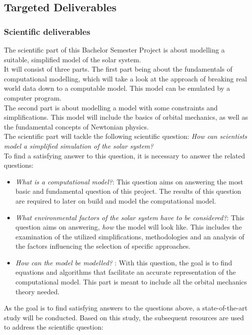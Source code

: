 \documentclass[conference,compsoc]{IEEEtran}
\begin{document}
\subsection{Targeted Deliverables}
\label{sec-deliverables}
\subsubsection{Scientific deliverables}
The scientific part of this Bachelor Semester Project is about modelling a suitable, simplified model of the solar system.\\
It will consist of three parts. The first part being about the fundamentals of computational modelling, which will take a look at the approach of breaking real world data down to a computable model. This model can be emulated by a computer program.\\
The second part is about modelling a model with some constraints and simplifications. This model will include the basics of orbital mechanics, as well as the fundamental concepts of Newtonian physics.\\ 
The scientific part will tackle the following scientific question: \emph{How can scientists model a simplified simulation of the solar system?} \\
To find a satisfying answer to this question, it is necessary to answer the related questions:
\begin{itemize}
	\item \emph{What is a computational model?}: This question aims on answering the most basic and fundamental question of this project. The results of this question are required to later on build and model the computational model.
	\item \emph{What environmental factors of the solar system have to be considered?}: This question aims on answering, \emph{how} the model will look like. This includes the examination of the utilized simplifications, methodologies and an analysis of the factors influencing the selection of specific approaches.
	\item \emph{How can the model be modelled? }: With this question, the goal is to find equations and algorithms that facilitate an accurate representation of the computational model. This part is meant to include all the orbital mechanics theory needed. 
\end{itemize}
As the goal is to find satisfying answers to the questions above, a state-of-the-art study will be conducted. 
Based on this study, the subsequent resources are used to address the scientific question:
\end{document}
